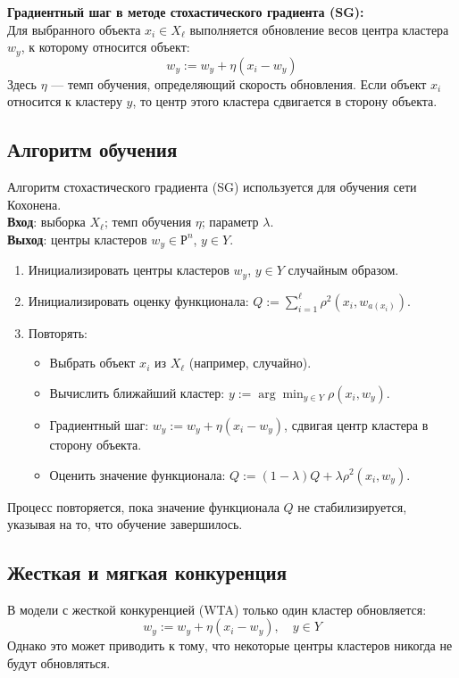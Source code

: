 \textbf{Градиентный шаг в методе стохастического градиента (SG):}\\
Для выбранного объекта $x_i \in X_\ell$ выполняется обновление весов центра кластера $w_y$, к которому относится объект:
\[
    w_y := w_y + \eta(x_i - w_y)
\]
Здесь $\eta$ — темп обучения, определяющий скорость обновления. Если объект $x_i$ относится к кластеру $y$, то центр этого кластера сдвигается в сторону объекта.

\subsection{Алгоритм обучения}
Алгоритм стохастического градиента (SG) используется для обучения сети Кохонена.\\

\textbf{Вход}: выборка $X_\ell$; темп обучения $\eta$; параметр $\lambda$.  \\
\textbf{Выход}: центры кластеров $w_y \in \mathbb{Р}^n$, $y \in Y$.

\begin{enumerate}
    \item Инициализировать центры кластеров $w_y$, $y \in Y$ случайным образом.
    \item Инициализировать оценку функционала: $Q := \sum_{i=1}^{\ell} \rho^2(x_i, w_{a(x_i)})$.
    \item Повторять:
          \begin{itemize}
              \item Выбрать объект $x_i$ из $X_\ell$ (например, случайно).
              \item Вычислить ближайший кластер: $y := \arg \min_{y \in Y} \rho(x_i, w_y)$.
              \item Градиентный шаг: $w_y := w_y + \eta(x_i - w_y)$, сдвигая центр кластера в сторону объекта.
              \item Оценить значение функционала: $Q := (1 - \lambda) Q + \lambda \rho^2(x_i, w_y)$.
          \end{itemize}
\end{enumerate}
Процесс повторяется, пока значение функционала $Q$ не стабилизируется, указывая на то, что обучение завершилось.

\subsection{Жесткая и мягкая конкуренция}
В модели с жесткой конкуренцией (WTA) только один кластер обновляется:
\[
    w_y := w_y + \eta(x_i - w_y), \quad y \in Y
\]
Однако это может приводить к тому, что некоторые центры кластеров никогда не будут обновляться.

